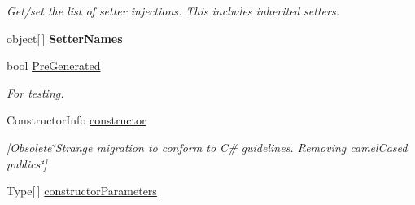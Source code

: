 \begin{DoxyCompactItemize}
\begin{DoxyCompactList}\small\item\em Get/set the list of setter injections. This includes inherited setters. \end{DoxyCompactList}\item 
\hypertarget{interfacestrange_1_1extensions_1_1reflector_1_1api_1_1_i_reflected_class_a1fc743c3ee65a2ba22004bed509cb58e}{object\mbox{[}$\,$\mbox{]} {\bfseries Setter\-Names}}\label{interfacestrange_1_1extensions_1_1reflector_1_1api_1_1_i_reflected_class_a1fc743c3ee65a2ba22004bed509cb58e}

\item 
bool \hyperlink{interfacestrange_1_1extensions_1_1reflector_1_1api_1_1_i_reflected_class_a61e16c964d8148fcea8c35055e7f8dc5}{Pre\-Generated}
\begin{DoxyCompactList}\small\item\em For testing. \end{DoxyCompactList}\item 
\hypertarget{interfacestrange_1_1extensions_1_1reflector_1_1api_1_1_i_reflected_class_a0de808e619b042cf6c1670915210edf3}{Constructor\-Info \hyperlink{interfacestrange_1_1extensions_1_1reflector_1_1api_1_1_i_reflected_class_a0de808e619b042cf6c1670915210edf3}{constructor}}\label{interfacestrange_1_1extensions_1_1reflector_1_1api_1_1_i_reflected_class_a0de808e619b042cf6c1670915210edf3}

\begin{DoxyCompactList}\small\item\em \mbox{[}Obsolete\char`\"{}\-Strange migration to conform to C\# guidelines. Removing camel\-Cased publics\char`\"{}\mbox{]} \end{DoxyCompactList}\item 
\hypertarget{interfacestrange_1_1extensions_1_1reflector_1_1api_1_1_i_reflected_class_a4cad8b84924441a15008d3183a49f41c}{Type\mbox{[}$\,$\mbox{]} \hyperlink{interfacestrange_1_1extensions_1_1reflector_1_1api_1_1_i_reflected_class_a4cad8b84924441a15008d3183a49f41c}{constructor\-Parameters}}\label{interfacestrange_1_1extensions_1_1reflector_1_1api_1_1_i_reflected_class_a4cad8b84924441a15008d3183a49f41c}


\end{DoxyCompactItemize}
